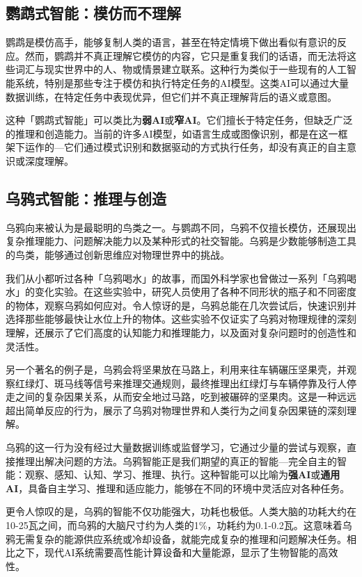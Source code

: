 \subsection{鹦鹉式智能：模仿而不理解}

鹦鹉是模仿高手，能够复制人类的语言，甚至在特定情境下做出看似有意识的反应。然而，鹦鹉并不真正理解它模仿的内容，它只是重复我们的话语，而无法将这些词汇与现实世界中的人、物或情景建立联系。这种行为类似于一些现有的人工智能系统，特别是那些专注于模仿和执行特定任务的AI模型。这类AI可以通过大量数据训练，在特定任务中表现优异，但它们并不真正理解背后的语义或意图。

这种「鹦鹉式智能」可以类比为{\bf 弱AI}或{\bf 窄AI}。它们擅长于特定任务，但缺乏广泛的推理和创造能力。当前的许多AI模型，如语言生成或图像识别，都是在这一框架下运作的---它们通过模式识别和数据驱动的方式执行任务，却没有真正的自主意识或深度理解。

\subsection{乌鸦式智能：推理与创造}

乌鸦向来被认为是最聪明的鸟类之一。与鹦鹉不同，乌鸦不仅擅长模仿，还展现出复杂推理能力、问题解决能力以及某种形式的社交智能。乌鸦是少数能够制造工具的鸟类，能够通过创新思维应对物理世界中的挑战。

我们从小都听过各种「乌鸦喝水」的故事，而国外科学家也曾做过一系列「乌鸦喝水」的变化实验。在这些实验中，研究人员使用了各种不同形状的瓶子和不同密度的物体，观察乌鸦如何应对。令人惊讶的是，乌鸦总能在几次尝试后，快速识别并选择那些能够最快让水位上升的物体。这些实验不仅证实了乌鸦对物理规律的深刻理解，还展示了它们高度的认知能力和推理能力，以及面对复杂问题时的创造性和灵活性。

另一个著名的例子是，乌鸦会将坚果放在马路上，利用来往车辆碾压坚果壳，并观察红绿灯、斑马线等信号来推理交通规则，最终推理出红绿灯与车辆停靠及行人停走之间的复杂因果关系，从而安全地过马路，吃到被碾碎的坚果肉。这是一种远远超出简单反应的行为，展示了乌鸦对物理世界和人类行为之间复杂因果链的深刻理解。

乌鸦的这一行为没有经过大量数据训练或监督学习，它通过少量的尝试与观察，直接推理出解决问题的方法。乌鸦智能正是我们期望的真正的智能---完全自主的智能：观察、感知、认知、学习、推理、执行。这种智能可以比喻为{\bf 强AI}或{\bf 通用AI}，具备自主学习、推理和适应能力，能够在不同的环境中灵活应对各种任务。

更令人惊叹的是，乌鸦的智能不仅功能强大，功耗也极低。人类大脑的功耗大约在10-25瓦之间，而乌鸦的大脑尺寸约为人类的1\%，功耗约为0.1-0.2瓦。这意味着乌鸦无需复杂的能源供应系统或冷却设备，就能完成复杂的推理和问题解决任务。相比之下，现代AI系统需要高性能计算设备和大量能源，显示了生物智能的高效性。

